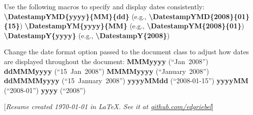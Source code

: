 \documentclass[letterpaper,MMMMyyyy,nonstopmode]{simpleresumecv}
\newcommand{\CVNote}{Resume created {\today} in \LaTeX. See it at \href{https://github.com/edgriebel/resume-cv}{\underline{github.com/edgriebel}}}
\newcommand{\Code}[1]{\mbox{\textbf{#1}}}
\newcommand{\CodeCommand}[1]{\mbox{\textbf{\textbackslash{#1}}}}
\begin{document}
\begin{Body}
\Gap
\BulletItem
Use the following macros to specify and display dates consistently:
\SubBulletItem
\CodeCommand{DatestampYMD\{yyyy\}\{MM\}\{dd\}}
(e.g., \CodeCommand{DatestampYMD\{2008\}\{01\}\{15\}})
\SubBulletItem
\CodeCommand{DatestampYM\{yyyy\}\{MM\}}
(e.g., \CodeCommand{DatestampYM\{2008\}\{01\}})
\SubBulletItem
\CodeCommand{DatestampY\{yyyy\}}
(e.g., \CodeCommand{DatestampY\{2008\}})

\Gap
\BulletItem
Change the date format option passed to the document class to adjust how dates are displayed throughout the document:
\SubBulletItem
\Code{MMMyyyy} (``Jan~2008'')
\SubBulletItem
\Code{ddMMMyyyy} (``15~Jan~2008'')
\SubBulletItem
\Code{MMMMyyyy} (``January~2008'')
\SubBulletItem
\Code{ddMMMMyyyy} (``15~January~2008'')
\SubBulletItem
\Code{yyyyMMdd} (``2008-01-15'')
\SubBulletItem
\Code{yyyyMM} (``2008-01'')
\SubBulletItem
\Code{yyyy} (``2008'')

\endgroup

\fi

\end{Body}


\UseNoteFont%
\null\hfill%
[\textit{\CVNote}]
\end{document}
